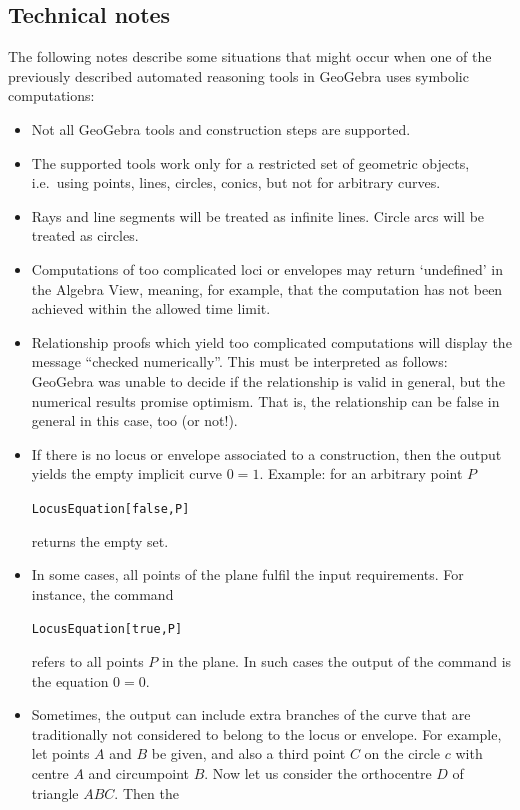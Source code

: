 \documentclass{article}
\begin{document}
\subsection{Technical notes}
\label{sec:TechnicalNotes}

The following notes describe some situations that might occur when one of the previously described automated reasoning tools in GeoGebra uses symbolic computations:
\begin{itemize}
\item Not all GeoGebra tools and construction steps are supported.
\item The supported tools work only for a restricted set of geometric objects, i.e.~using points, lines, circles, conics, but not for arbitrary curves.
\item Rays and line segments will be treated as infinite lines. Circle arcs will be treated as circles.
\item Computations of too complicated loci or envelopes may return `undefined' in the Algebra View, meaning, for example, that the computation has not been achieved within the allowed time limit.
\item Relationship proofs which yield too complicated computations will display the message ``checked numerically''. This must be
interpreted as follows: GeoGebra was unable to decide if the relationship is valid in general, but the numerical results promise optimism.
That is, the relationship can be false in general in this case, too (or not!).
\item If there is no locus or envelope associated to a construction, then the output yields the empty implicit curve $0=1$. Example: for an arbitrary point $P$
\begin{center}
\texttt{LocusEquation[false,P]}
\end{center}
returns the empty set.
\item In some cases, all points of the plane fulfil the input requirements. For instance, the command
\begin{center}
\texttt{LocusEquation[true,P]}
\end{center}
refers to all points $P$ in the plane. In such cases the output of the command is the equation $0=0$.
\item Sometimes, the output can include extra branches of the curve that are traditionally not considered to belong to the locus or envelope.
For example, let points $A$ and $B$ be given, and also a third point $C$ on the circle $c$ with centre $A$
and circumpoint $B$. Now let us consider the orthocentre $D$ of triangle $ABC$. Then the

\end{itemize}
\end{document}
